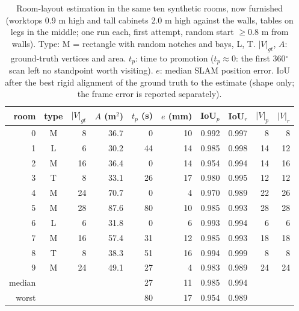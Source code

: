 \begin{table}[t]
\centering
\caption{Room-layout estimation in the same ten synthetic rooms, now furnished (worktops 0.9 m high and tall cabinets 2.0 m high against the walls, tables on legs in the middle; one run each, first attempt, random start $\geq$0.8 m from walls). Type: M = rectangle with random notches and bays, L, T. $|V|_{gt}$, $A$: ground-truth vertices and area. $t_p$: time to promotion ($t_p\approx0$: the first 360$^\circ$ scan left no standpoint worth visiting). $e$: median SLAM position error. IoU after the best rigid alignment of the ground truth to the estimate (shape only; the frame error is reported separately).}
\label{tab:estimation-synthetic-furnished}
\begin{tabular}{r c r r r r r r r r}
\toprule
room & type & $|V|_{gt}$ & $A$ (m$^2$) & $t_p$ (s) & $e$ (mm) & IoU$_p$ & IoU$_r$ & $|V|_p$ & $|V|_r$ \\
\midrule
0 & M & 8 & 36.7 & 0 & 10 & 0.992 & 0.997 & 8 & 8 \\
1 & L & 6 & 30.2 & 44 & 14 & 0.985 & 0.998 & 14 & 12 \\
2 & M & 16 & 36.4 & 0 & 14 & 0.954 & 0.994 & 14 & 16 \\
3 & T & 8 & 33.1 & 26 & 17 & 0.980 & 0.995 & 12 & 12 \\
4 & M & 24 & 70.7 & 0 & 4 & 0.970 & 0.989 & 22 & 26 \\
5 & M & 28 & 87.6 & 80 & 10 & 0.985 & 0.993 & 28 & 28 \\
6 & L & 6 & 31.8 & 0 & 6 & 0.993 & 0.994 & 6 & 6 \\
7 & M & 16 & 57.4 & 31 & 12 & 0.985 & 0.993 & 18 & 18 \\
8 & T & 8 & 38.3 & 51 & 16 & 0.994 & 0.999 & 8 & 8 \\
9 & M & 24 & 49.1 & 27 & 4 & 0.983 & 0.989 & 24 & 24 \\
\midrule
median & & & & 27 & 11 & 0.985 & 0.994 & & \\
worst & & & & 80 & 17 & 0.954 & 0.989 & & \\
\bottomrule
\end{tabular}
\end{table}
